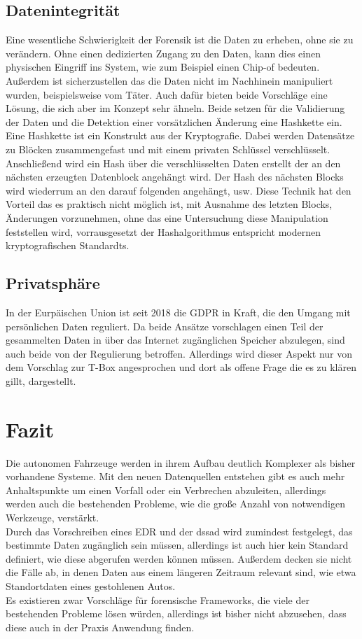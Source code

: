 \documentclass[conference,compsoc,final,a4paper]{IEEEtran}
\begin{document}
\subsection{Datenintegrität}

Eine wesentliche Schwierigkeit der Forensik ist die Daten zu erheben, ohne sie zu verändern. Ohne einen dedizierten Zugang
zu den Daten, kann dies einen physischen Eingriff ins System, wie zum Beispiel einen Chip-of bedeuten.
Außerdem ist sicherzustellen das die Daten nicht im Nachhinein manipuliert wurden, beispielsweise vom Täter.
Auch dafür bieten beide Vorschläge eine Lösung, die sich aber im Konzept sehr ähneln.
Beide setzen für die Validierung der Daten und die Detektion einer vorsätzlichen Änderung eine Hashkette ein.\\
Eine Hashkette ist ein Konstrukt aus der Kryptografie.
Dabei werden Datensätze zu Blöcken zusammengefast und mit einem privaten Schlüssel verschlüsselt.
Anschließend wird ein Hash über die verschlüsselten Daten erstellt der an den nächsten erzeugten Datenblock angehängt wird.
Der Hash des nächsten Blocks wird wiederrum an den darauf folgenden angehängt, usw.
Diese Technik hat den Vorteil das es praktisch nicht möglich ist, mit Ausnahme des letzten Blocks, Änderungen vorzunehmen, ohne das eine
Untersuchung diese Manipulation feststellen wird, vorrausgesetzt der Hashalgorithmus entspricht modernen kryptografischen Standardts.

\subsection{Privatsphäre}
In der Eurpäischen Union ist seit 2018 die \ac{GDPR} in Kraft, die den Umgang mit persönlichen Daten
reguliert. Da beide Ansätze vorschlagen einen Teil der gesammelten Daten in über das Internet zugänglichen Speicher
abzulegen, sind auch beide von der Regulierung betroffen. Allerdings wird dieser Aspekt nur von dem Vorschlag zur T-Box angesprochen und dort als
offene Frage die es zu klären gillt, dargestellt.~\cite{Lee_2019}

\section{Fazit}

Die autonomen Fahrzeuge werden in ihrem Aufbau deutlich Komplexer als bisher vorhandene Systeme.
Mit den neuen Datenquellen entstehen gibt es auch mehr Anhaltspunkte um einen Vorfall oder ein Verbrechen
abzuleiten, allerdings werden auch die bestehenden Probleme, wie die große Anzahl von notwendigen Werkzeuge, verstärkt.\\
Durch das Vorschreiben eines \ac{EDR} und der \ac{dssad} wird zumindest festgelegt, das bestimmte Daten zugänglich sein müssen,
allerdings ist auch hier kein Standard definiert, wie diese abgerufen werden können müssen.
Außerdem decken sie nicht die Fälle ab, in denen Daten aus einem längeren Zeitraum relevant sind, wie etwa Standortdaten eines gestohlenen Autos.\\
Es existieren zwar Vorschläge für forensische Frameworks, die viele der bestehenden Probleme lösen würden, allerdings ist bisher nicht abzusehen, dass diese auch in der Praxis Anwendung finden.
\end{document}
